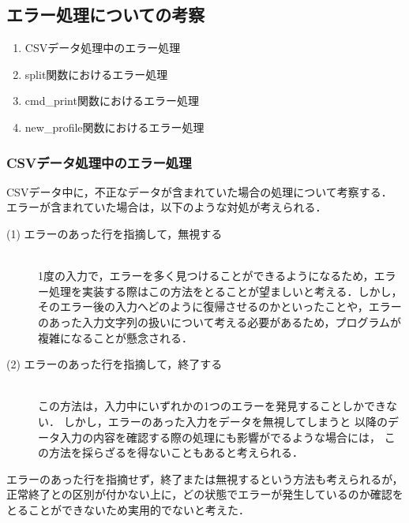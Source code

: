 \documentclass[a4j,11pt]{jarticle}
\begin{document}
\subsection{エラー処理についての考察}
\begin{enumerate}
\setlength{\parskip}{2pt} \setlength{\itemsep}{2pt}
    \item CSVデータ処理中のエラー処理
    \item split関数におけるエラー処理
    \item cmd\_print関数におけるエラー処理
    \item new\_profile関数におけるエラー処理
\end{enumerate}


\subsubsection{CSVデータ処理中のエラー処理}

CSVデータ中に，不正なデータが含まれていた場合の処理について考察する．
エラーが含まれていた場合は，以下のような対処が考えられる．

\begin{description} %
  \item[(1) エラーのあった行を指摘して，無視する]~\\
1度の入力で，エラーを多く見つけることができるようになるため，エラー処理を実装する際はこの方法をとることが望ましいと考える．しかし，そのエラー後の入力へどのように復帰させるのかといったことや，エラーのあった入力文字列の扱いについて考える必要があるため，プログラムが複雑になることが懸念される．
  \item[(2) エラーのあった行を指摘して，終了する]~\\
    この方法は，入力中にいずれかの1つのエラーを発見することしかできない．
    しかし，エラーのあった入力をデータを無視してしまうと
    以降のデータ入力の内容を確認する際の処理にも影響がでるような場合には，
    この方法を採らざるを得ないこともあると考えられる．
\end{description}

エラーのあった行を指摘せず，終了または無視するという方法も考えられるが，正常終了との区別が付かない上に，どの状態でエラーが発生しているのか確認をとることができないため実用的でないと考えた．
\end{document}
